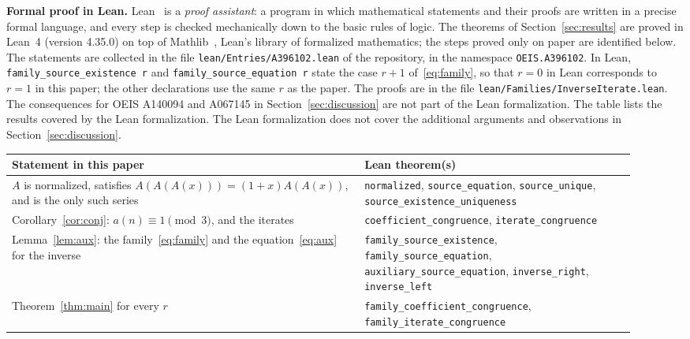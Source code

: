 \documentclass[11pt,a4paper]{article}
\theoremstyle{definition}
\theoremstyle{remark}
\newcommand{\para}[1]{\par\medskip\noindent\textbf{#1}\enspace}
\begin{document}
\para{Formal proof in Lean.}
Lean~\cite{lean} is a \emph{proof assistant}: a program in which mathematical statements and their proofs are written
in a precise formal language, and every step is checked mechanically down to the basic rules of logic. The theorems of Section~\ref{sec:results} are proved in Lean~4 (version 4.35.0) on top of
Mathlib~\cite{mathlib}, Lean's library of formalized mathematics; the steps proved only on paper are identified below. The statements are collected in the file \texttt{lean/Entries/A396102.lean} of the repository,
in the namespace \texttt{OEIS.A396102}. In Lean, \texttt{family\_source\_existence r} and \texttt{family\_source\_equation r} state the case $r+1$ of~\eqref{eq:family}, so that $r=0$ in Lean corresponds to $r=1$ in this paper; the other declarations use the same $r$ as the paper. The proofs are in the file \texttt{lean/Families/InverseIterate.lean}. The consequences for OEIS A140094 and A067145 in Section~\ref{sec:discussion} are not part of the Lean formalization.
The table lists the results covered by the Lean formalization. The Lean formalization does not cover the additional arguments and observations in Section~\ref{sec:discussion}.
\begin{center}\small\renewcommand{\arraystretch}{1.25}
\begin{tabular}{>{\raggedright\arraybackslash}p{0.52\linewidth}>{\raggedright\arraybackslash}p{0.4\linewidth}}
\toprule
Statement in this paper & Lean theorem(s)\\
\midrule
$A$ is normalized, satisfies $A(A(A(x)))=(1+x)A(A(x))$, and is the only such series & \texttt{normalized}, \texttt{source\_\allowbreak{}equation}, \texttt{source\_\allowbreak{}unique}, \texttt{source\_\allowbreak{}existence\_\allowbreak{}uniqueness} \\
Corollary~\ref{cor:conj}: $a(n)\equiv1\pmod3$, and the iterates & \texttt{coefficient\_\allowbreak{}congruence}, \texttt{iterate\_\allowbreak{}congruence} \\
Lemma~\ref{lem:aux}: the family~\eqref{eq:family} and the equation~\eqref{eq:aux} for the inverse & \texttt{family\_\allowbreak{}source\_\allowbreak{}existence}, \texttt{family\_\allowbreak{}source\_\allowbreak{}equation}, \texttt{auxiliary\_\allowbreak{}source\_\allowbreak{}equation}, \texttt{inverse\_\allowbreak{}right}, \texttt{inverse\_\allowbreak{}left} \\
Theorem~\ref{thm:main} for every $r$ & \texttt{family\_\allowbreak{}coefficient\_\allowbreak{}congruence}, \texttt{family\_\allowbreak{}iterate\_\allowbreak{}congruence} \\
\bottomrule
\end{tabular}
\end{center}
\end{document}

